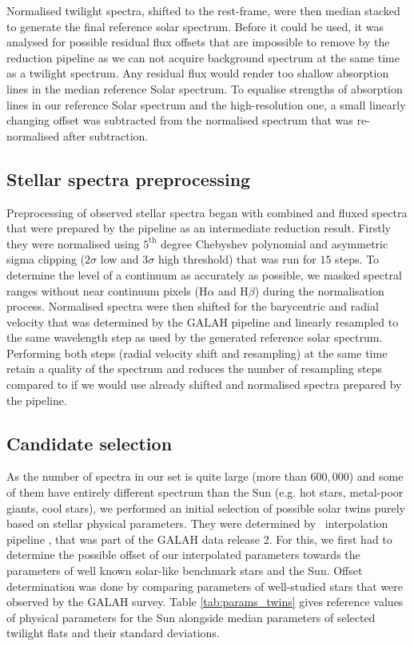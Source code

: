 Normalised twilight spectra, shifted to the rest-frame, were then median stacked to generate the final reference solar spectrum. Before it could be used, it was analysed for possible residual flux offsets that are impossible to remove by the reduction pipeline as we can not acquire background spectrum at the same time as a twilight spectrum. Any residual flux would render too shallow absorption lines in the median reference Solar spectrum. To equalise strengths of absorption lines in our reference Solar spectrum and the high-resolution one, a small linearly changing offset was subtracted from the normalised spectrum that was re-normalised after subtraction. 

\subsection{Stellar spectra preprocessing}
\label{sec:05_preprocessing}
Preprocessing of observed stellar spectra began with combined and fluxed spectra that were prepared by the pipeline as an intermediate reduction result. Firstly they were normalised using $5^\text{th}$ degree Chebyshev polynomial and asymmetric sigma clipping ($2\sigma$ low and $3\sigma$ high threshold) that was run for $15$ steps. To determine the level of a continuum as accurately as possible, we masked spectral ranges without near continuum pixels (H$\alpha$ and H$\beta$) during the normalisation process. Normalised spectra were then shifted for the barycentric and radial velocity that was determined by the GALAH pipeline and linearly resampled to the same wavelength step as used by the generated reference solar spectrum. Performing both steps (radial velocity shift and resampling) at the same time retain a quality of the spectrum and reduces the number of resampling steps compared to if we would use already shifted and normalised spectra prepared by the pipeline.

\subsection{Candidate selection}
\label{sec:05_candidates}
As the number of spectra in our set is quite large (more than $600,000$) and some of them have entirely different spectrum than the Sun (e.g. hot stars, metal-poor giants, cool stars), we performed an initial selection of possible solar twins purely based on stellar physical parameters. They were determined by \TC\ interpolation pipeline \cite{buder2018}, that was part of the GALAH data release 2. For this, we first had to determine the possible offset of our interpolated parameters towards the parameters of well known solar-like benchmark stars \cite{2014A&A...564A.133J, 2015A&A...582A..49H} and the Sun. Offset determination was done by comparing parameters of well-studied stars that were observed by the GALAH survey. Table \ref{tab:params_twins} gives reference values of physical parameters for the Sun alongside median parameters of selected twilight flats and their standard deviations. 

